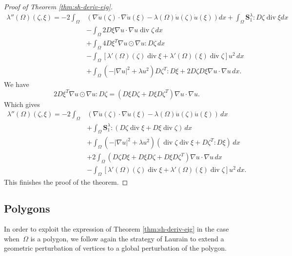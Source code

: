 \documentclass[11pt]{article}
\numberwithin{equation}{section}\newtheorem*{jepEnonce}{\jepEnonceTitle}\newenvironment{enonce*}[1]{\def\jepEnonceTitle{#1}\jepEnonce}{\endjepEnonce}\newtheorem*{conj*}{Conjecture}
\theoremstyle{plain}
\theoremstyle{definition}
\newcommand{\di}{\operatorname{div}}
\newcommand{\bo}[1]{{\boldsymbol#1}}
\begin{document}
\begin{proof}[Proof of Theorem \ref{thm:sh-deriv-eig}]
\begin{align*}
\lambda''(\Omega)(\zeta,\xi)  = -2\int_\Omega&\left(\nabla \dot u(\zeta)\cdot \nabla \dot u(\xi) - \lambda(\Omega)\dot u(\zeta)\dot u(\xi)\right)dx + \int_\Omega \bo S_1^\lambda :D\zeta \di \xi dx\\
&-\int_\Omega 2D\xi \nabla u \cdot \nabla u \di \zeta\, dx\\
&+\int_\Omega 4 D\xi^T \nabla u \odot \nabla u :D\zeta\, dx \\
& - \int_\Omega [\lambda'(\Omega)(\zeta) \di \xi +\lambda'(\Omega)(\xi)\di \zeta] u^2\, dx\\
& +\int_\Omega (-|\nabla u|^2+\lambda u^2) D\zeta^T: D\xi +2 D\zeta D\xi \nabla u \cdot \nabla u\, dx .
\end{align*}
We have
\[
2D\xi^T \nabla u \odot \nabla u :D\zeta = (D\xi D\zeta + D\xi D\zeta^T)\nabla u \cdot \nabla u.
\]
Which gives
\begin{align*}
\lambda''(\Omega)(\zeta,\xi) = -2\int_\Omega &\left(\nabla \dot u(\zeta)\cdot \nabla \dot u(\xi) -\lambda(\Omega)\dot u(\zeta)\dot u(\xi)\right)\, dx \\
&+ \int_\Omega \bo S_1^\lambda :(D\zeta \di \xi+D\xi \di \zeta)\, dx \\
&+\int_\Omega (-|\nabla u|^2+\lambda u^2)(\di \zeta \di \xi+D\zeta^T:D\xi)\, dx\\
&+2\int_\Omega (D\zeta D\xi +D\xi D\zeta + D\xi D\zeta^T)\nabla u \cdot \nabla u\, dx\\
& - \int_\Omega [\lambda'(\Omega)(\zeta) \di \xi +\lambda'(\Omega)(\xi)\di \zeta] u^2\, dx.
\end{align*}
This finishes the proof of the theorem.
\end{proof}


\subsection{Polygons}
In order to exploit the expression of Theorem \ref{thm:sh-deriv-eig} in the case when~$\Omega$ is a polygon, we follow again the strategy of Laurain \cite{laurain2ndDeriv} to extend a geometric perturbation of vertices to a global perturbation of the polygon.
\end{document}
